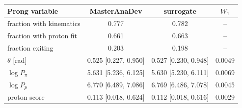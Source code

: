 \begin{tabular}{lccc}
\toprule
Prong variable & MasterAnaDev & surrogate & $W_1$ \\
\midrule
fraction with kinematics & 0.777 & 0.782 & -- \\
fraction with proton fit & 0.661 & 0.663 & -- \\
fraction exiting & 0.203 & 0.198 & -- \\
$\theta$ [rad] & 0.525 [0.227, 0.950] & 0.527 [0.230, 0.948] & 0.0049 \\
$\log P_\pi$ & 5.631 [5.236, 6.125] & 5.630 [5.230, 6.111] & 0.0069 \\
$\log P_p$ & 6.770 [6.489, 7.086] & 6.769 [6.486, 7.078] & 0.0045 \\
proton score & 0.113 [0.018, 0.624] & 0.112 [0.018, 0.616] & 0.0029 \\
\bottomrule
\end{tabular}
